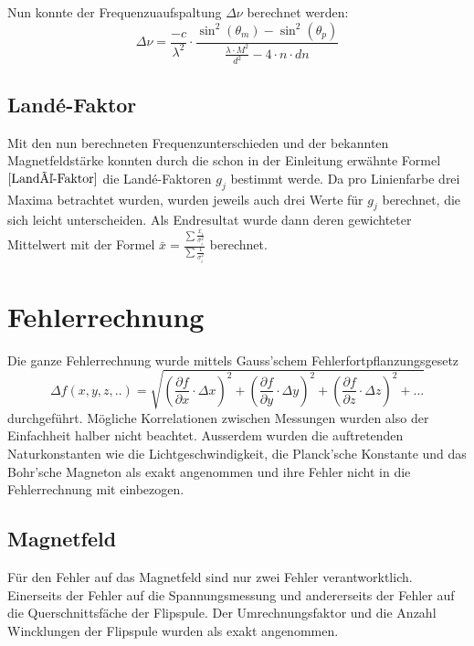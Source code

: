 \documentclass[a4paper,parskip,11pt, DIV12]{scrreprt}
\begin{document}
Nun konnte der Frequenzuaufspaltung $\Delta \nu$ berechnet werden:
	\begin{equation}
	\label{Frequenzunterschied}
	\Delta \nu = \frac{-c}{\lambda^2}\cdot\frac{\sin^2(\theta_m)-\sin^2(\theta_p)}{\frac{\lambda \cdot M^2}{d^2}-4\cdot n \cdot dn}
	\end{equation}
	
	\section{Landé-Faktor}
	
	Mit den nun berechneten Frequenzunterschieden und der bekannten Magnetfeldstärke konnten durch die schon in der Einleitung erwähnte Formel $\eqref{Landé-Faktor}$ die Landé-Faktoren $g_j$ bestimmt werde. Da pro Linienfarbe drei Maxima betrachtet wurden, wurden jeweils auch drei Werte für $g_j$ berechnet, die sich leicht unterscheiden. Als Endresultat wurde dann deren gewichteter Mittelwert mit der Formel  $\bar{x} = \frac{\sum\frac{x_i}{\sigma_i^2}}{\sum \frac{1}{\sigma_i^2}}$ berechnet. 
 
	 
	\chapter{Fehlerrechnung}
	Die ganze Fehlerrechnung wurde mittels Gauss'schem Fehlerfortpflanzungsgesetz 
	\begin{equation}
	\label{Fehlerfortpflanzungsgesetz}
	\Delta f(x,y,z,..) = \sqrt{(\frac{\partial f}{\partial x} \cdot \Delta x)^2+(\frac{\partial f}{\partial y} \cdot \Delta y)^2+(\frac{\partial f}{\partial z} \cdot \Delta z)^2+...}
	\end{equation}
	durchgeführt. Mögliche Korrelationen zwischen Messungen wurden also der Einfachheit halber nicht beachtet. Ausserdem wurden die auftretenden Naturkonstanten wie die Lichtgeschwindigkeit, die Planck'sche Konstante und das Bohr'sche Magneton als exakt angenommen und ihre Fehler nicht in die Fehlerrechnung mit einbezogen.  
	\section{Magnetfeld}
	Für den Fehler auf das Magnetfeld sind nur zwei Fehler verantworktlich. Einerseits der Fehler auf die Spannungsmessung und andererseits der Fehler auf die Querschnittsfäche der Flipspule. Der Umrechnungsfaktor und die Anzahl Wincklungen der Flipspule wurden als exakt angenommen. 
	
\end{document}
